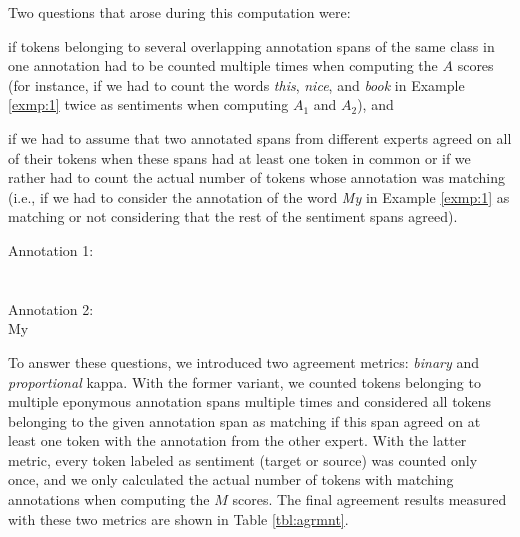 Two questions that arose during this computation were:
\begin{inparaenum}
\item if tokens belonging to several overlapping annotation spans of
  the same class in one annotation had to be counted multiple times
  when computing the $A$ scores (for instance, if we had to count
  the words \textit{this}, \textit{nice}, and \textit{book} in
  Example \ref{exmp:1} twice as sentiments when computing $A_1$ and
  $A_2$), and
\item if we had to assume that two annotated spans from different
  experts agreed on all of their tokens when these spans had at
  least one token in common or if we rather had to count the actual
  number of tokens whose annotation was matching (i.e., if we had to
  consider the annotation of the word \textit{My} in Example
  \ref{exmp:1} as matching or not considering that the rest of the
  sentiment spans agreed).
\end{inparaenum}

\begin{example}\label{exmp:1}
  \textrm{Annotation 1:}\\ \\\\ \textrm{Annotation 2:}\\ My 
\end{example}

To answer these questions, we introduced two agreement metrics:
\emph{binary} and \emph{proportional} kappa.  With the former variant,
we counted tokens belonging to multiple eponymous annotation spans
multiple times and considered all tokens belonging to the given
annotation span as matching if this span agreed on at least one token
with the annotation from the other expert.  With the latter metric,
every token labeled as sentiment (target or source) was counted only
once, and we only calculated the actual number of tokens with matching
annotations when computing the $M$ scores.  The final agreement
results measured with these two metrics are shown in Table
\ref{tbl:agrmnt}.

